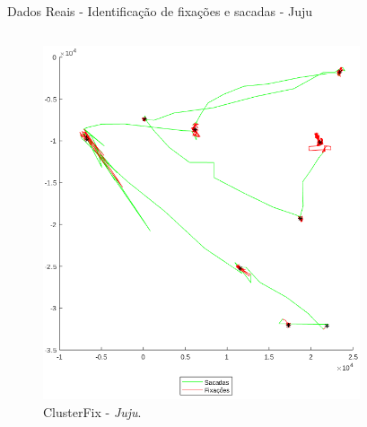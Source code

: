 \documentclass[10pt]{beamer}
\begin{document}
\begin{frame}{Dados Reais - Identificação de fixações e sacadas -  Juju}
    \begin{columns}
        \begin{column}{0.48\textwidth}
            \begin{figure}[H]
                \begin{center}
                    \includegraphics[scale=0.25]{imagens/juju_clusterfix.png}
                    \caption{ClusterFix - \textit{Juju}.}
                \end{center}
            \end{figure}
        \end{column}
        \begin{column}{0.48\textwidth}
            \begin{figure}[H]
                \begin{center}

\end{center}
\end{figure}
\end{column}
\end{columns}
\end{frame}
\end{document}
